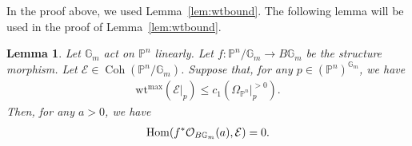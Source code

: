 \documentclass [11pt,oneside,a4paper,mathscr]{amsart}
\newtheorem{lemma}[thm]{Lemma}
\theoremstyle{definition}
\renewcommand{\leq}{\leqslant}
\newcommand{\bgm}{B\mathbb{G}_m}
\newcommand{\Coh}{\operatorname{Coh}}
\newcommand{\Hom}{\operatorname{Hom}}
\newcommand{\wt}{\mathrm{wt}}
\begin{document}
In the proof above, we used Lemma~\ref{lem:wtbound}. The following lemma will be used 
in the proof of Lemma~\ref{lem:wtbound}. 
\begin{lemma}\label{lem:Pn}
Let $\mathbb{G}_m$ act on $\mathbb{P}^n$
linearly.
 Let $f \colon \mathbb{P}^n/\mathbb{G}_m \to \bgm$ be the structure morphism. 
Let $\mathcal{E} \in \Coh(\mathbb{P}^n/\mathbb{G}_m)$. 
Suppose that, for any $p \in (\mathbb{P}^n)^{\mathbb{G}_m}$, 
we have 
\begin{align}\label{wt:condE}
\wt^{\mathrm{max}}(\mathcal{E}|_{p}) \leq
 c_1(\Omega_{\mathbb{P}^n}|_p^{>0}).    
\end{align}
Then, for any $a>0$, we have 
\begin{align}\notag
\Hom(f^*\mathcal{O}_{\bgm}(a), \mathcal{E})
=0. 
\end{align}
\end{lemma}
\end{document}
